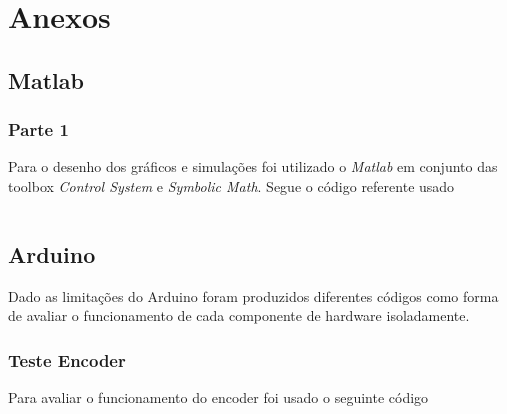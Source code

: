 \documentclass[a4paper,11pt]{article}
\begin{document}
\nocite{matlabcontrol}
\nocite{matlabsymbolic}
\nocite{ogata2010modern}

\section*{Anexos}



\subsection*{Matlab}

\subsubsection*{Parte 1}
Para o desenho dos gráficos e simulações foi utilizado o \textit{Matlab} em conjunto das toolbox \textit{Control System}\cite{matlabcontrol} e \textit{Symbolic Math}\cite{matlabsymbolic}. Segue o código referente usado

\inputminted[xleftmargin=15pt,linenos,frame=single,framesep=5pt,breaklines=true]{matlab}{../matlab/project.m}

\newpage
\subsection*{Arduino}
Dado as limitações do Arduino foram produzidos diferentes códigos como forma de avaliar o funcionamento de cada componente de hardware isoladamente.

\subsubsection*{Teste Encoder}
Para avaliar o funcionamento do encoder foi usado o seguinte código
\inputminted[xleftmargin=15pt,linenos,frame=single,framesep=5pt,breaklines=true]{c++}{../arduino/test_enconder/test_enconder.ino}
\end{document}
